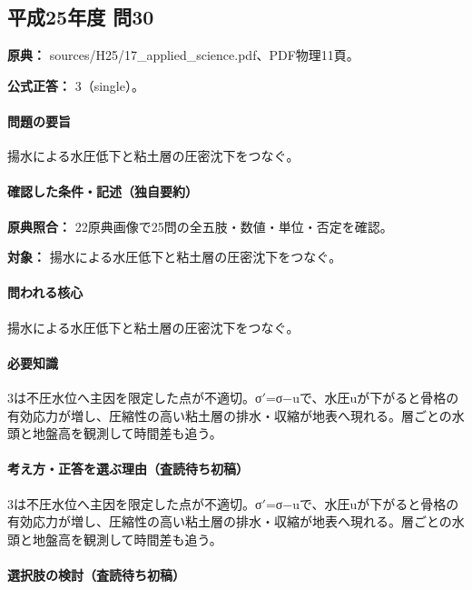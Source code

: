 \subsection{平成25年度 問30}
\label{q:h25-reg-applied-30}

\noindent\textbf{原典：} sources/H25/17\_applied\_science.pdf、PDF物理11頁。

\textbf{公式正答：} 3（single）。

\paragraph{問題の要旨} 揚水による水圧低下と粘土層の圧密沈下をつなぐ。

\paragraph{確認した条件・記述（独自要約）}\mbox{}\par

\noindent\textbf{原典照合：} 22原典画像で25問の全五肢・数値・単位・否定を確認。\par

\noindent\textbf{対象：} 揚水による水圧低下と粘土層の圧密沈下をつなぐ。\par

\paragraph{問われる核心} 揚水による水圧低下と粘土層の圧密沈下をつなぐ。

\paragraph{必要知識} 3は不圧水位へ主因を限定した点が不適切。σ\ensuremath{'}=σ−uで、水圧uが下がると骨格の有効応力が増し、圧縮性の高い粘土層の排水・収縮が地表へ現れる。層ごとの水頭と地盤高を観測して時間差も追う。

\paragraph{考え方・正答を選ぶ理由（査読待ち初稿）} 3は不圧水位へ主因を限定した点が不適切。σ\ensuremath{'}=σ−uで、水圧uが下がると骨格の有効応力が増し、圧縮性の高い粘土層の排水・収縮が地表へ現れる。層ごとの水頭と地盤高を観測して時間差も追う。

\paragraph{選択肢の検討（査読待ち初稿）}\mbox{}\par

